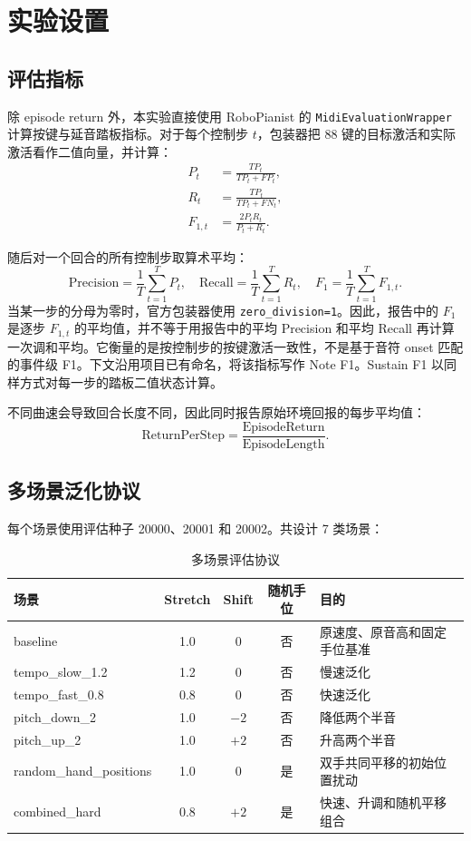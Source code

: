 \documentclass[UTF8,a4paper,11pt]{ctexart}
\begin{document}
\section{实验设置}

\subsection{评估指标}

除 episode return 外，本实验直接使用 RoboPianist 的 \texttt{MidiEvaluationWrapper} 计算按键与延音踏板指标。对于每个控制步 $t$，包装器把 88 键的目标激活和实际激活看作二值向量，并计算：
\begin{align}
P_t &= \frac{TP_t}{TP_t+FP_t},\\
R_t &= \frac{TP_t}{TP_t+FN_t},\\
F_{1,t} &= \frac{2P_tR_t}{P_t+R_t}.
\end{align}

随后对一个回合的所有控制步取算术平均：
\begin{equation}
\mathrm{Precision}=\frac{1}{T}\sum_{t=1}^{T}P_t,\quad
\mathrm{Recall}=\frac{1}{T}\sum_{t=1}^{T}R_t,\quad
F_1=\frac{1}{T}\sum_{t=1}^{T}F_{1,t}.
\end{equation}
当某一步的分母为零时，官方包装器使用 \texttt{zero\_division=1}。因此，报告中的 $F_1$ 是逐步 $F_{1,t}$ 的平均值，并不等于用报告中的平均 Precision 和平均 Recall 再计算一次调和平均。它衡量的是按控制步的按键激活一致性，不是基于音符 onset 匹配的事件级 F1。下文沿用项目已有命名，将该指标写作 Note F1。Sustain F1 以同样方式对每一步的踏板二值状态计算。

不同曲速会导致回合长度不同，因此同时报告原始环境回报的每步平均值：
\begin{equation}
\mathrm{ReturnPerStep}=
\frac{\mathrm{EpisodeReturn}}{\mathrm{EpisodeLength}}.
\end{equation}

\subsection{多场景泛化协议}

每个场景使用评估种子 20000、20001 和 20002。共设计 7 类场景：
\begin{table}[H]
\centering
\caption{多场景评估协议}
\begin{tabularx}{\textwidth}{lcccX}
\toprule
场景 & Stretch & Shift & 随机手位 & 目的 \\
\midrule
baseline & 1.0 & 0 & 否 & 原速度、原音高和固定手位基准 \\
tempo\_slow\_1.2 & 1.2 & 0 & 否 & 慢速泛化 \\
tempo\_fast\_0.8 & 0.8 & 0 & 否 & 快速泛化 \\
pitch\_down\_2 & 1.0 & $-2$ & 否 & 降低两个半音 \\
pitch\_up\_2 & 1.0 & $+2$ & 否 & 升高两个半音 \\
random\_hand\_positions & 1.0 & 0 & 是 & 双手共同平移的初始位置扰动 \\
combined\_hard & 0.8 & $+2$ & 是 & 快速、升调和随机平移组合 \\
\bottomrule
\end{tabularx}
\end{table}
\end{document}
